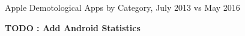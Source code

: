 Apple Demotological Apps by Category, July 2013\cite{Brewer_2013} vs May 2016

\textbf{TODO : Add Android Statistics}